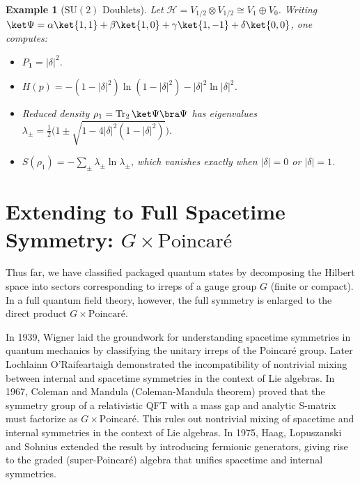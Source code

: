 \documentclass[12pt,a4paper]{article}
\newtheorem{example}{Example}
\begin{document}
\begin{example}[$\mathrm{SU}(2)$ Doublets]
	Let $\mathcal H=V_{1/2}\otimes V_{1/2}\cong V_1\oplus V_0$.  Writing
	$\ket\Psi=\alpha\ket{1,1}+\beta\ket{1,0}+\gamma\ket{1,-1}+\delta\ket{0,0}$,
	one computes:
	\begin{itemize}
		\item $P_{\mathbf1}=|\delta|^2$.
		\item $H(p)=-(1-|\delta|^2)\ln(1-|\delta|^2)-|\delta|^2\ln|\delta|^2$.
		\item Reduced density $\rho_1=\operatorname{Tr}_2\ket\Psi\bra\Psi$ has eigenvalues 
		$\lambda_\pm=\tfrac12\bigl(1\pm\sqrt{1-4|\delta|^2(1-|\delta|^2)}\bigr)$.
		\item $S(\rho_1)=-\sum_{\pm}\lambda_\pm\ln\lambda_\pm$, which vanishes exactly when $|\delta|=0$ or $|\delta|=1$.
	\end{itemize}
\end{example}





\section{Extending to Full Spacetime Symmetry: $G \times \mathrm{Poincaré}$}
\label{SEC:ExtendingToFullSpacetimeSymmetry}


Thus far, we have classified packaged quantum states by decomposing the Hilbert space into sectors corresponding to irreps of a gauge group $G$ (finite or compact).
In a full quantum field theory, however, the full symmetry is enlarged to the direct product $G \times \mathrm{Poincaré}$.


In 1939, Wigner \cite{Wigner1939} laid the groundwork for understanding spacetime symmetries in quantum mechanics by classifying the unitary irreps of the Poincaré group.
Later Lochlainn O’Raifeartaigh \cite{ORaifeartaigh1965} demonstrated the incompatibility of nontrivial mixing between internal and spacetime symmetries in the context of Lie algebras.
In 1967, Coleman and Mandula (Coleman-Mandula theorem) \cite{ColemanMandula1967} proved that the symmetry group of a relativistic QFT with a mass gap and analytic S-matrix must factorize as $ G \times \text{Poincaré} $.
This rules out nontrivial mixing of spacetime and internal symmetries in the context of Lie algebras.
In 1975, Haag, Lopuszanski and Sohnius \cite{HLS1975} extended the result by introducing fermionic generators, giving rise to the graded (super-Poincaré) algebra that unifies spacetime and internal symmetries.
\end{document}

